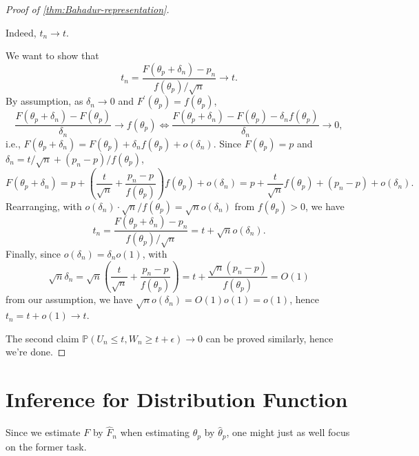 \begin{proof}[Proof of \autoref{thm:Bahadur-representation}]
	\begin{claim}
		Indeed, \(t_n \to t\).
	\end{claim}
	\begin{explanation}
		We want to show that
		\[
			t_n = \frac{F(\theta _p + \delta _n) - p_n}{f(\theta _p) / \sqrt{n} } \to t.
		\]
		By assumption, as \(\delta _n \to 0\) and \(F^{\prime} (\theta _p) = f(\theta _p)\),
		\[
			\frac{F(\theta _p + \delta _n) - F(\theta _p)}{\delta _n} \to f(\theta _p)
			\iff \frac{F(\theta _p + \delta _n) - F(\theta _p) - \delta _n f(\theta _p)}{\delta _n} \to 0,
		\]
		i.e., \(F(\theta _p + \delta _n) = F(\theta _p) + \delta _n f(\theta _p) + o(\delta _n)\). Since \(F(\theta _p) = p\) and \(\delta _n = t / \sqrt{n} + (p_n - p) / f(\theta _p)\),
		\[
			F(\theta _p + \delta _n)
			= p + \left( \frac{t}{\sqrt{n}} + \frac{p_n - p}{f(\theta _p)} \right) f(\theta _p) + o(\delta _n)
			= p + \frac{t}{\sqrt{n} } f(\theta _p) + (p_n - p) + o(\delta _n).
		\]
		Rearranging, with \(o(\delta _n) \cdot \sqrt{n} / f(\theta _p) = \sqrt{n} o(\delta _n) \) from \(f(\theta _p) > 0\), we have
		\[
			t_n
			= \frac{F(\theta _p + \delta _n) - p_n}{f(\theta _p) / \sqrt{n} }
			= t + \sqrt{n} o(\delta _n).
		\]
		Finally, since \(o(\delta _n) = \delta _n o(1)\), with
		\[
			\sqrt{n} \delta _n
			= \sqrt{n} \left( \frac{t}{\sqrt{n} } + \frac{p_n - p}{f(\theta _p)} \right)
			= t + \frac{\sqrt{n} (p_n - p)}{f(\theta _p)}
			= O(1)
		\]
		from our assumption, we have \(\sqrt{n} o(\delta _n) = O(1) o(1) = o(1)\), hence \(t_n = t + o(1) \to t\).
	\end{explanation}
	The second claim \(\mathbb{P} (U_n \leq t, W_n \geq t+\epsilon ) \to 0\) can be proved similarly, hence we're done.
\end{proof}

\section{Inference for Distribution Function}
Since we estimate \(F\) by \(\hat{F} _n\) when estimating \(\theta _p\) by \(\hat{\theta} _p\), one might just as well focus on the former task.

